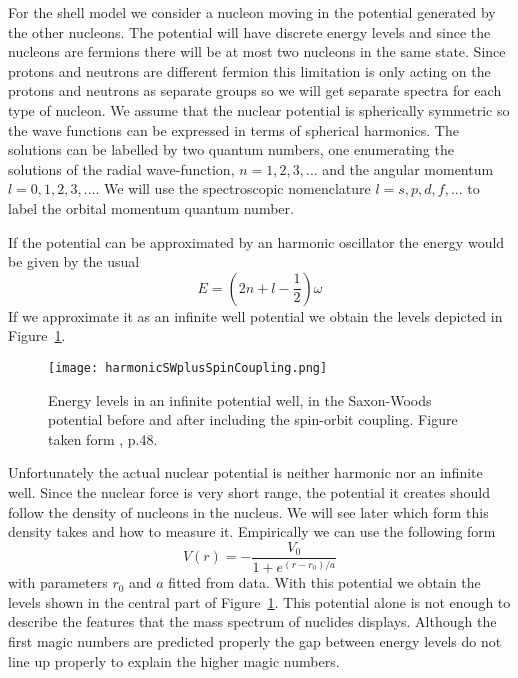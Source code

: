 \documentclass[12pt]{article}
\begin{document}
For the shell model we consider a nucleon moving in the potential generated by the other nucleons. The potential will have discrete energy levels and since the nucleons are fermions there will be at most two nucleons in the same state. Since protons and neutrons are different fermion this limitation is only acting on the protons and neutrons as separate groups so we will get separate spectra for each type of nucleon. We assume that the nuclear potential is spherically symmetric so the wave functions can be expressed in terms of spherical harmonics. The solutions can be labelled by two quantum numbers, one enumerating the solutions of the radial wave-function, $n=1,2,3,...$ and the angular momentum $l=0,1,2,3,...$. We will use the spectroscopic nomenclature $l=s,p,d,f,...$ to label the orbital momentum quantum number. 

If the potential can be approximated by an harmonic oscillator the energy would be given by the usual
\[E=\left(2n+l-\frac{1}{2}\right)\omega\] 
If we approximate it as an infinite well potential we obtain the levels depicted in Figure~\ref{fig:levels}.

\begin{figure}
\begin{center}
\texttt{[image: harmonicSWplusSpinCoupling.png]}
\caption{Energy levels in an infinite potential well, in the Saxon-Woods potential before and after including the spin-orbit coupling. Figure taken form \cite{Lilley:2009zz}, p.48.}\label{fig:levels}
\end{center}
\end{figure}

Unfortunately the actual nuclear potential is neither harmonic nor an infinite well. Since the nuclear force is very short range, the potential it creates should follow the density of nucleons in the nucleus. We will see later which form this density takes and how to measure it. Empirically we can use the following form 
\[V(r)=-\frac{V_0}{1+e^{(r-r_0)/a}}\]
with parameters $r_0$ and $a$ fitted from data. With this potential we obtain the levels shown in the central part of Figure~\ref{fig:levels}. This potential alone is not enough to describe the features that the mass spectrum of nuclides displays. Although the first magic numbers are predicted properly the gap between energy levels do not line up properly to explain the higher magic numbers.
\end{document}
